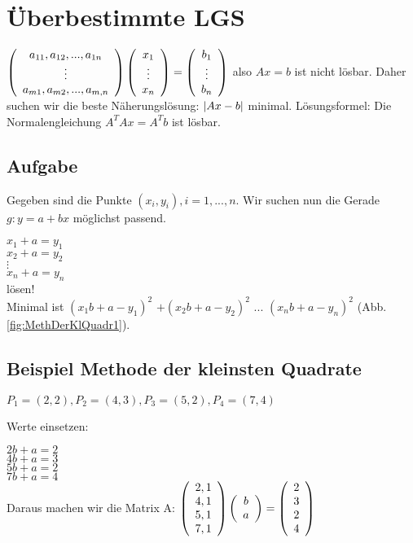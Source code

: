 \section{Überbestimmte LGS}
$
  \left(  \begin{array}{c} a_{11}, a_{12}, ..., a_{1n}\\\vdots\\a_{m1}, a_{m2}, ..., a_{m,n}  \end{array}  \right)  
  \left(  \begin{array}{c} x_1\\\vdots\\x_n \end{array}  \right)  
=
  \left(  \begin{array}{c} b_1\\\vdots\\b_n \end{array}  \right)  
$
also $A x = b$ ist nicht lösbar. Daher suchen wir die beste Näherungslösung: $  \left\vert A x - b \right\vert $ minimal. 
Lösungsformel: Die Normalengleichung $A^T A x = A^T b$ ist lösbar. 

\subsection{Aufgabe}
Gegeben sind die Punkte $(x_i,y_i), i=1, ..., n$. Wir suchen nun die Gerade $g: y=a+bx$ möglichst passend. 

$x_1 + a = y_1$\\
$x_2 + a = y_2$\\
$\vdots$\\
$x_n + a = y_n$\\
lösen!\\

Minimal ist 
$(x_1 b + a -y_1)^2$
$+(x_2 b + a -y_2)^2$
$...$
$(x_n b + a -y_n)^2$ (Abb. \ref{fig:MethDerKlQuadr1}).

\subsection{Beispiel Methode der kleinsten Quadrate}
$ P_1 = (2,2), P_2=(4,3), P_3=(5,2), P_4=(7,4)$

Werte einsetzen:

$2b+a=2$\\
$4b+a=3$\\
$5b+a=2$\\
$7b+a=4$\\

Daraus machen wir die Matrix A: 
$
  \left(  \begin{array}{c} 2,1\\4,1\\5,1\\7,1 \end{array}  \right)  
  \left(  \begin{array}{c} b\\a \end{array}  \right)  
=
  \left(  \begin{array}{c} 2\\3\\2\\4 \end{array}  \right)  
$

